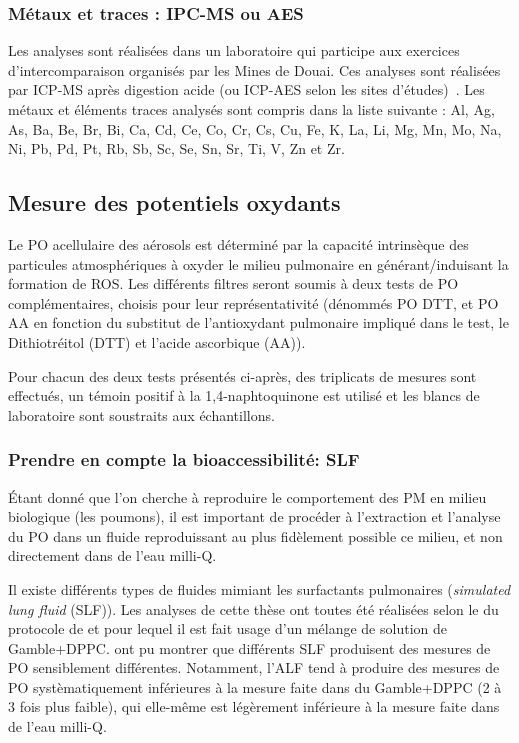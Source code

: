 \subsubsection{Métaux et traces : IPC-MS ou AES}%
\label{ssub:métaux_et_traces}

Les analyses sont réalisées dans un laboratoire qui
participe aux exercices d’intercomparaison organisés par les Mines de Douai. Ces analyses
sont réalisées par ICP-MS après digestion acide (ou ICP-AES selon les sites
d'études)~\autocite{allemanPM102010,mbengueSizedistributed2014,cenAmbient2005}.
Les métaux et éléments traces analysés sont compris dans la liste suivante : Al, Ag, As,
Ba, Be, Br, Bi, Ca, Cd, Ce, Co, Cr, Cs, Cu, Fe, K, La, Li, Mg, Mn, Mo, Na, Ni, Pb, Pd, Pt,
Rb, Sb, Sc, Se, Sn, Sr, Ti, V, Zn et Zr.

\subsection{Mesure des potentiels oxydants}%
\label{sub:potentiels_oxydants}

Le PO acellulaire des aérosols est déterminé par la capacité intrinsèque des particules
atmosphériques à oxyder le milieu pulmonaire en générant/induisant la formation de ROS.
Les différents filtres seront soumis à deux tests de PO complémentaires, choisis pour
leur représentativité (dénommés PO DTT, et PO AA en fonction du substitut de
l’antioxydant pulmonaire impliqué dans le test, le Dithiotréitol (DTT) et l’acide
ascorbique (AA)). 

Pour chacun des deux tests présentés ci-après, des triplicats de mesures sont effectués, un
témoin positif à la 1,4-naphtoquinone est utilisé et les blancs de laboratoire sont
soustraits aux échantillons.

\subsubsection{Prendre en compte la bioaccessibilité: SLF}%
\label{sub:prendre_en_compte_la_bioaccessibilite_slf}

Étant donné que l'on cherche à reproduire le comportement des PM en milieu biologique
(les poumons), il est important de procéder à l'extraction et l'analyse du PO dans un
fluide reproduissant au plus fidèlement possible ce milieu, et non directement dans de
l'eau milli-Q.

Il existe différents types de fluides mimiant les surfactants pulmonaires
(\textit{simulated lung fluid} (SLF)). Les analyses de cette thèse ont toutes été
réalisées selon le du protocole de \textcite{calasPollution2017} et pour lequel il est fait
usage d'un mélange de solution de Gamble+DPPC.  \textcite{calasImportance2017} ont pu
montrer que différents SLF produisent des mesures de PO sensiblement différentes.
Notamment, l'ALF tend à produire des mesures de PO systèmatiquement inférieures à la
mesure faite dans du Gamble+DPPC (2 à 3 fois plus faible), qui elle-même est légèrement
inférieure à la mesure faite dans de l'eau milli-Q.

